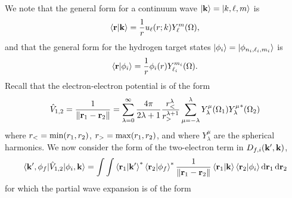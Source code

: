 \documentclass{article}
\begin{document}
We note that the general form for a continuum wave
$\ket{\vb{k}} = \ket{k, \ell, m}$ is
\begin{equation*}
  \braket{\vb{r}}{\vb{k}}
  =
  \dfrac{1}{r}
  u_{\ell}(r; k)
  Y_{\ell}^{m}(\Omega)
  ,
\end{equation*}
and that the general form for the hydrogen target states
$\ket{\phi_{i}} = \ket{\phi_{n_{i}, \ell_{i}, m_{i}}}$ is
\begin{equation*}
  \braket{\vb{r}}{\phi_{i}}
  =
  \dfrac{1}{r}
  \phi_{i}(r)
  Y_{\ell_{i}}^{m_{i}}(\Omega)
  .
\end{equation*}
Recall that the electron-electron potential is of the form
\begin{equation*}
  \hat{V}_{1, 2}
  =
  \dfrac{1}{\lVert\vb{r}_{1} - \vb{r}_{2}\rVert}
  =
  \sum_{\lambda = 0}^{\infty}
  \dfrac{4\pi}{2\lambda + 1}
  \dfrac{r_{<}^{\lambda}}{r_{>}^{\lambda + 1}}
  \sum_{\mu = -\lambda}^{\lambda}
  Y_{\lambda}^{\mu}(\Omega_{1})
  {Y_{\lambda}^{\mu}}^{*}(\Omega_{2})
\end{equation*}
where $r_{<} = \min(r_{1}, r_{2})$, $r_{>} = \max(r_{1}, r_{2})$,
and where $Y_{\lambda}^{\mu}$ are the spherical harmonics.
We now consider the form of the two-electron term in
$D_{f, i}(\vb{k}', \vb{k})$,
\begin{equation*}
  \mel{\vb{k}', \phi_{f}}{\hat{V}_{1, 2}}{\phi_{i}, \vb{k}}
  =
  \int
  \int
  {
    \braket{\vb{r}_{1}}{\vb{k}'}^{*}
    \braket{\vb{r}_{2}}{\phi_{f}}^{*}
    \dfrac{1}{\lVert\vb{r}_{1} - \vb{r}_{2}\rVert}
    \braket{\vb{r}_{1}}{\vb{k}}
    \braket{\vb{r}_{2}}{\phi_{i}}
  }
  \dd{\vb{r}_{1}}
  \dd{\vb{r}_{2}}
\end{equation*}
for which the partial wave expansion is of the form
\end{document}
